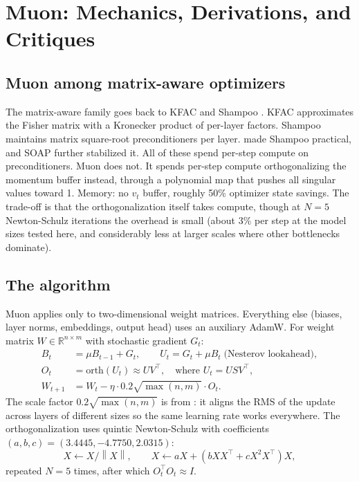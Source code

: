 \documentclass[11pt]{article}
\newcommand{\R}{\mathbb{R}}
\newcommand{\norm}[1]{\left\|#1\right\|}
\begin{document}
\section{Muon: Mechanics, Derivations, and Critiques}
\label{sec:muon}

\subsection{Muon among matrix-aware optimizers}
The matrix-aware family goes back to KFAC \citep{martens2015kfac} and Shampoo \citep{gupta2018shampoo}. KFAC approximates the Fisher matrix with a Kronecker product of per-layer factors. Shampoo maintains matrix square-root preconditioners per layer. \citet{anil2020scalable} made Shampoo practical, and SOAP \citep{vyas2024soap} further stabilized it. All of these spend per-step compute on preconditioners. Muon does not. It spends per-step compute orthogonalizing the momentum buffer instead, through a polynomial map that pushes all singular values toward 1. Memory: no $v_t$ buffer, roughly 50\% optimizer state savings. The trade-off is that the orthogonalization itself takes compute, though at $N=5$ Newton-Schulz iterations the overhead is small (about 3\% per step at the model sizes tested here, and considerably less at larger scales where other bottlenecks dominate).

\subsection{The algorithm}
Muon applies only to two-dimensional weight matrices. Everything else (biases, layer norms, embeddings, output head) uses an auxiliary AdamW. For weight matrix $W\in\R^{n\times m}$ with stochastic gradient $G_t$:
\begin{align}
B_t &= \mu B_{t-1}+G_t,\qquad U_t=G_t+\mu B_t\;\text{(Nesterov lookahead)},\\
O_t &= \mathrm{orth}(U_t)\approx UV^\top,\quad\text{where }U_t=USV^\top,\\
W_{t+1} &= W_t - \eta\cdot 0.2\sqrt{\max(n,m)}\cdot O_t.
\end{align}
The scale factor $0.2\sqrt{\max(n,m)}$ is from \citet{liu2025moonlight}: it aligns the RMS of the update across layers of different sizes so the same learning rate works everywhere. The orthogonalization uses quintic Newton-Schulz with coefficients $(a,b,c)=(3.4445,-4.7750,2.0315)$:
\begin{equation}
X\leftarrow X/\norm{X},\qquad X\leftarrow aX+(bXX^\top+cX^2X^\top)X,
\end{equation}
repeated $N=5$ times, after which $O_t^\top O_t\approx I$.
\end{document}
